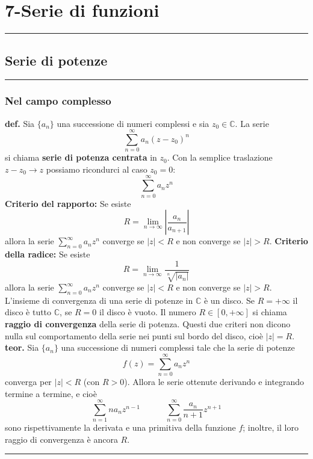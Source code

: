 \section*{7-Serie di funzioni}
\rule{\textwidth}{2pt}
\subsection*{Serie di potenze}
\rule{\textwidth}{0,4pt}
\subsubsection*{Nel campo complesso}
\textbf{def.} Sia $\{a_n\}$ una successione di numeri complessi e sia $z_0 \in \mathbb{C}$.\newline
La serie
\[
    \sum_{n=0}^{\infty} a_n (z-z_0)^n
\]
si chiama \textbf{serie di potenza centrata} in $z_0$.\newline
\newline
Con la semplice traslazione $z-z_0 \rightarrow z$ possiamo ricondurci al caso $z_0 = 0$:
\[
    \sum_{n=0}^{\infty}a_n z^n
\]
\newline
\textbf{Criterio del rapporto:} Se esiste
\[
    R = \lim_{n\rightarrow \infty}\left| \frac{a_n}{a_{n+1}}\right|
\]
allora la serie $\sum_{n=0}^{\infty}a_n z^n$ converge se $|z|< R$ e non converge se $|z|> R$.\newline
\newline
\textbf{Criterio della radice:} Se esiste
\[
    R = \lim_{n\rightarrow \infty} \frac{1}{\sqrt[n]{|a_n|}}
\]
allora la serie $\sum_{n=0}^{\infty}a_n z^n$ converge se $|z| < R$ e non converge se $|z|> R$.\newline
\newline
L'insieme di convergenza di una serie di potenze in $\mathbb{C}$ è un disco.\newline
Se $R = +\infty$ il disco è tutto $\mathbb{C}$, se $R = 0$ il disco è vuoto. Il numero $R \in [0, + \infty]$ si chiama \textbf{raggio di convergenza} della serie di potenza.\newline
\newline
Questi due criteri non dicono nulla sul comportamento della serie nei punti sul bordo del disco, cioè $|z| = R$.\newline
\textbf{teor.} Sia $\{a_n\}$ una successione di numeri complessi tale che la serie di potenze
\[
    f(z) = \sum_{n=0}^{\infty} a_n z^n
\]
converga per $|z|<R$ (con $R> 0$). Allora le serie ottenute derivando e integrando termine a termine, e cioè
\[
    \sum_{n=1}^{\infty} n a_n z^{n-1} \quad \quad \quad \sum_{n=0}^{\infty} \frac{a_n}{n+1} z^{n+1}
\]
sono rispettivamente la derivata e una primitiva della funzione $f$; inoltre, il loro raggio di convergenza è ancora $R$.\newline
\newline
\rule{\textwidth}{0,4pt}

